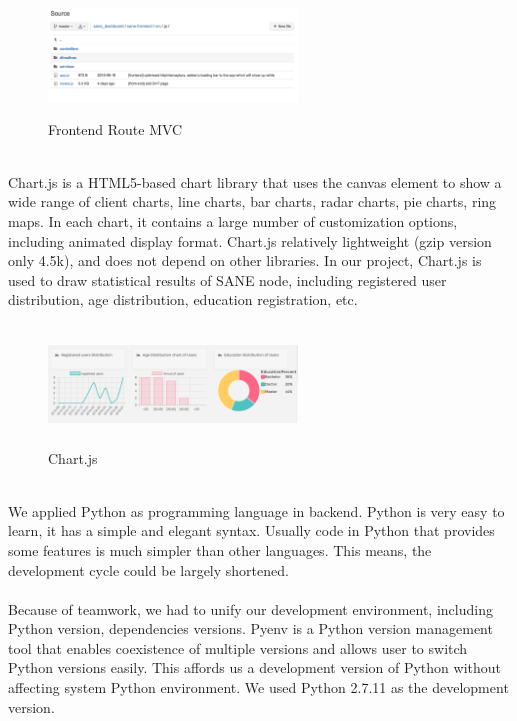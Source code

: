 \documentclass[12pt,oneside,a4paper]{article}
\begin{document}
\begin{figure}[htb]
\centering
\includegraphics[width=250px, height=120px]{angular.png}
\caption{Frontend Route MVC}
\label{picture-label10}
\end{figure}\\
Chart.js is a HTML5-based chart library that uses the canvas element to show a wide range of client charts, line charts, bar charts, radar charts, pie charts, ring maps. In each chart, it contains a large number of customization options, including animated display format. Chart.js relatively lightweight (gzip version only 4.5k), and does not depend on other libraries. In our project, Chart.js is used to draw statistical results of SANE node, including registered user distribution, age distribution, education registration, etc.\\
\begin{figure}[htb]
\centering
\includegraphics[width=250px, height=120px]{chartjs.png}
\caption{Chart.js}
\label{picture-label11}
\end{figure}\\
We applied Python as programming language in backend. Python is very easy to learn, it has a simple and elegant syntax. Usually code in Python that provides some features is much simpler than other languages. This means, the development cycle could be largely shortened.\\\\
Because of teamwork, we had to unify our development environment, including Python version, dependencies versions. Pyenv is a Python version management tool that enables coexistence of multiple versions and allows user to switch Python versions easily. This affords us a development version of Python without affecting system Python environment. We used Python 2.7.11 as the development version.\\\\
\end{document}
